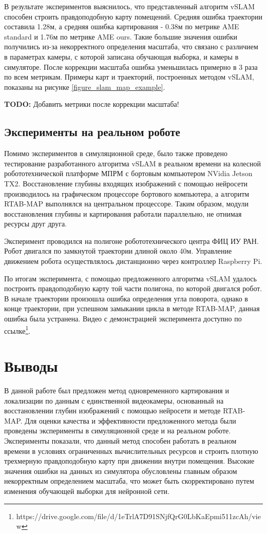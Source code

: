\documentclass{mipt-thesis-ms}
\begin{document}
	В результате экспериментов выяснилось, что представленный алгоритм vSLAM способен строить правдоподобную карту помещений. Средняя ошибка траектории составила 1.28м, а средняя ошибка картирования - 0.38м по метрике AME standard и 1.76м по метрике AME ours. Такие большие значения ошибки получились из-за некорректного определения масштаба, что связано с различием в параметрах камеры, с которой записана обучающая выборка, и камеры в симуляторе. После коррекции масштаба ошибка уменьшилась примерно в 3 раза по всем метрикам. Примеры карт и траекторий, построенных методом vSLAM, показаны на рисунке \ref{figure_slam_map_example}.
	
	\textbf{TODO:} Добавить метрики после коррекции масштаба!
	
	\subsection{Эксперименты на реальном роботе}
	
	Помимо экспериментов в симуляционной среде, было также проведено тестирование разработанного алгоритма vSLAM в реальном времени на колесной робототехнической платформе МПРМ с бортовым компьютером NVidia Jetson TX2. Восстановление глубины входящих изображений с помощью нейросети производилось на графическом процессоре бортового компьютера, а алгоритм RTAB-MAP выполнялся на центральном процессоре. Таким образом, модули восстановления глубины и картирования работали параллельно, не отнимая ресурсы друг друга.
	
	Эксперимент проводился на полигоне робототехнического центра ФИЦ ИУ РАН. Робот двигался по замкнутой траектории длиной около 40м. Управление движением робота осуществлялось дистанционно через контроллер Raspberry Pi.
	
	По итогам эксперимента, с помощью предложенного алгоритма vSLAM удалось построить правдоподобную карту той части полигона, по которой двигался робот. В начале траектории произошла ошибка определения угла поворота, однако в конце траектории, при успешном замыкании цикла в методе RTAB-MAP, данная ошибка была устранена. Видео с демонстрацией эксперимента доступно по ссылке\footnote{https://drive.google.com/file/d/1eTrlA7D91SNjfQrG0LbKaEpmi511zcAh/view}.
	
	\section{Выводы}
	
	В данной работе был предложен метод одновременного картирования и локализации по данным с единственной видеокамеры, основанный на восстановлении глубин изображений с помощью нейросети и методе RTAB-MAP. Для оценки качества и эффективности предложенного метода были проведены эксперименты в симуляционной среде и на реальном роботе. Эксперименты показали, что данный метод способен работать в реальном времени в условиях ограниченных вычислительных ресурсов и строить плотную трехмерную правдоподобную карту при движении внутри помещения. Высокие значения ошибки на данных из симулятора обусловлены главным образом некорректным определением масштаба, что может быть скорректировано путем изменения обучающей выборки для нейронной сети.
	
\end{document}
